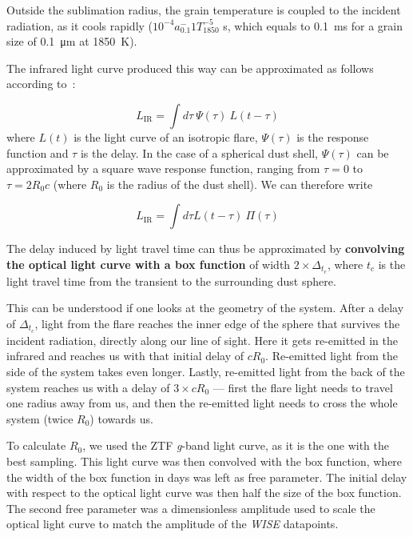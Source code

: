 Outside the sublimation radius, the grain temperature is coupled to the incident radiation, as it cools rapidly ($10^{-4} a_{0.1}^-1T_{1850}^{-5}$ s, which equals to \SI{0.1}{\milli\s} for a grain size of \SI{0.1}{\micro\m} at \SI{1850}{\K}).

The infrared light curve produced this way can be approximated as follows according to~\cite{Velzen2016}:

\begin{equation}
    L_\text{IR} = \int d\tau~ \Psi(\tau) ~L(t-\tau)
\end{equation}
where $L(t)$ is the light curve of an isotropic flare,  $\Psi(\tau)$ is the response function and $\tau$ is the delay. In the case of a spherical dust shell, $\Psi(\tau)$ can be approximated by a square wave response function, ranging from $\tau=0$ to $\tau = 2 R_0 c$ (where $R_0$ is the radius of the dust shell). We can therefore write

\begin{equation}
    L_\text{IR} = \int d\tau L (t-\tau) ~\Pi (\tau)
\end{equation}

The delay induced by light travel time can thus be approximated by \textbf{convolving the optical light curve with a box function} of width $2\times\Delta_{t_c}$, where $t_c$ is the light travel time from the transient to the surrounding dust sphere.

This can be understood if one looks at the geometry of the system. After a delay of $\Delta_{t_c}$, light from the flare reaches the inner edge of the sphere that survives the incident radiation, directly along our line of sight. Here it gets re-emitted in the infrared and reaches us with that initial delay of $cR_0$. Re-emitted light from the side of the system takes even longer. Lastly, re-emitted light from the back of the system reaches us with a delay of $3\times cR_0$ --- first the flare light needs to travel one radius away from us, and then the re-emitted light needs to cross the whole system (twice $R_0$) towards us.

To calculate $R_0$, we used the ZTF \textit{g}-band light curve, as it is the one with the best sampling. This light curve was then convolved with the box function, where the width of the box function in days was left as free parameter. The initial delay with respect to the optical light curve was then half the size of the box function. The second free parameter was a dimensionless amplitude used to scale the optical light curve to match the amplitude of the \textit{WISE} datapoints.


